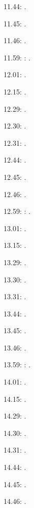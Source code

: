 \documentclass[italian]{article}
\begin{document}
11.44:   .

11.45:   .

11.46:   .

11.59:   
:   .

12.01:    . 

12.15:    . 

12.29:    . 

12.30:    .

12.31:    .

12.44:    .

12.45:    .

12.46:    .

12.59:    
:    . 

13.01:     . 

13.15:     . 

13.29:     . 

13.30:     .

13.31:     .

13.44:     .

13.45:     .

13.46:     .

13.59:     
:    .

14.01:     . 

14.15:     . 

14.29:     . 

14.30:     .

14.31:     .

14.44:     .

14.45:     .

14.46:     .
\end{document}
